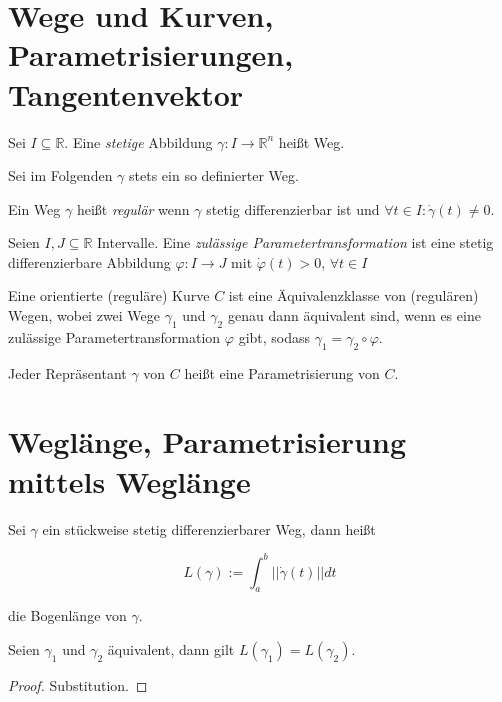\section{Wege und Kurven, Parametrisierungen, Tangentenvektor}
\begin{definition}[Weg]
	Sei $I \subseteq \mathbb{R}$. Eine \textit{stetige} Abbildung $\gamma: I \rightarrow \mathbb{R}^n$ hei\ss t Weg.
\end{definition}

Sei im Folgenden $\gamma$ stets ein so definierter Weg.

\begin{definition}
	Ein Weg $\gamma$ hei\ss t \textit{regul\"ar} wenn $\gamma$ stetig differenzierbar ist und $\forall t \in I: \dot{\gamma}(t) \neq 0$.
\end{definition}

\begin{definition}[Parametertransformation]
	Seien $I,J \subseteq \mathbb{R}$ Intervalle.
	Eine \textit{zul\"assige Parametertransformation} ist eine stetig differenzierbare Abbildung $\varphi: I \rightarrow J$ mit $\dot{\varphi}(t) > 0$, $\forall t \in I$
\end{definition}

\begin{definition}[Kurve]
	Eine orientierte (regul\"are) Kurve $C$ ist eine \"Aquivalenzklasse von (regul\"aren) Wegen, wobei zwei Wege $\gamma_1$ und $\gamma_2$ genau dann \"aquivalent sind, wenn es eine zul\"assige Parametertransformation $\varphi$ gibt, sodass $\gamma_1 = \gamma_2 \circ \varphi$.
	
	Jeder Repr\"asentant $\gamma$ von $C$ hei\ss t eine Parametrisierung von $C$.
\end{definition}




\section{Wegl\"ange, Parametrisierung mittels Wegl\"ange}
\begin{definition}
	Sei $\gamma$ ein stückweise stetig differenzierbarer Weg, dann hei\ss t 
	
	$$L(\gamma) := \int_a^b ||\dot{\gamma}(t)||dt$$
	
	die Bogenl\"ange von $\gamma$.
\end{definition}

\begin{lemma}
	Seien $\gamma_1$ und $\gamma_2$ \"aquivalent, dann gilt $L(\gamma_1) = L(\gamma_2)$.
\end{lemma}
\begin{proof}
	Substitution.
\end{proof}


